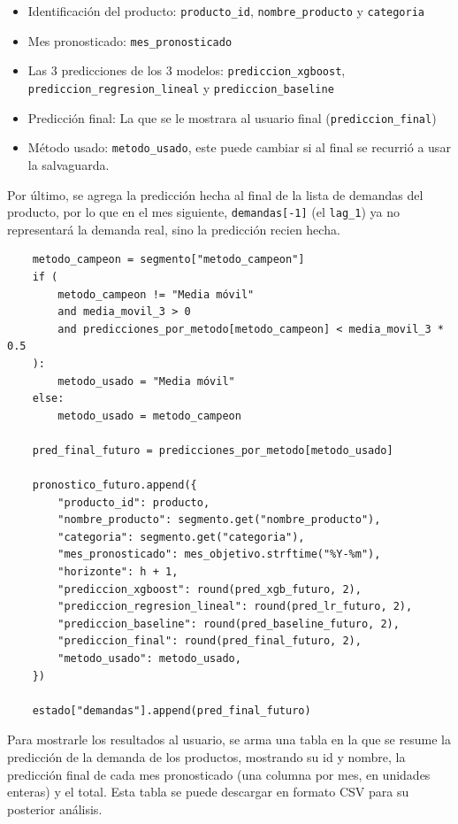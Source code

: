 \begin{itemize}
    \item Identificación del producto: \texttt{producto\_id}, \texttt{nombre\_producto} y \texttt{categoria}
    \item Mes pronosticado: \texttt{mes\_pronosticado}
    \item Las 3 predicciones de los 3 modelos: \texttt{prediccion\_xgboost}, \texttt{prediccion\_regresion\_lineal} y \texttt{prediccion\_baseline}
    \item Predicción final: La que se le mostrara al usuario final (\texttt{prediccion\_final})
    \item Método usado: \texttt{metodo\_usado}, este puede cambiar si al final se recurrió a usar la salvaguarda.
\end{itemize}

Por último, se agrega la predicción hecha al final de la lista de demandas del producto, por lo que en el mes siguiente, \texttt{demandas[-1]} (el \texttt{lag\_1}) ya no representará la demanda real, sino la predicción recien hecha.

\label{lst:seleccion_metodo_futuro}
\begin{verbatim}
    metodo_campeon = segmento["metodo_campeon"]
    if (
        metodo_campeon != "Media móvil"
        and media_movil_3 > 0
        and predicciones_por_metodo[metodo_campeon] < media_movil_3 * 0.5
    ):
        metodo_usado = "Media móvil"
    else:
        metodo_usado = metodo_campeon

    pred_final_futuro = predicciones_por_metodo[metodo_usado]

    pronostico_futuro.append({
        "producto_id": producto,
        "nombre_producto": segmento.get("nombre_producto"),
        "categoria": segmento.get("categoria"),
        "mes_pronosticado": mes_objetivo.strftime("%Y-%m"),
        "horizonte": h + 1,
        "prediccion_xgboost": round(pred_xgb_futuro, 2),
        "prediccion_regresion_lineal": round(pred_lr_futuro, 2),
        "prediccion_baseline": round(pred_baseline_futuro, 2),
        "prediccion_final": round(pred_final_futuro, 2),
        "metodo_usado": metodo_usado,
    })

    estado["demandas"].append(pred_final_futuro)
\end{verbatim}

Para mostrarle los resultados al usuario, se arma una tabla en la que se resume la predicción de la demanda de los productos, mostrando su id y nombre, la predicción final de cada mes pronosticado (una columna por mes, en unidades enteras) y el total. Esta tabla se puede descargar en formato CSV para su posterior análisis.